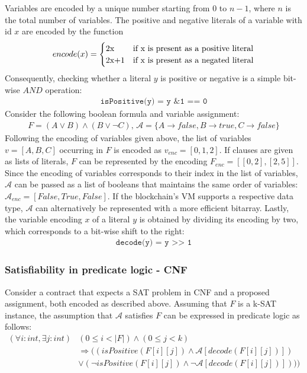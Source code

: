 Variables are encoded by a unique number starting from $0$ to $n-1$, where $n$ is the total number of variables. The positive and negative literals of a variable with id $x$ are encoded by the function
\begin{align*}
encode(x) =
\begin{cases}
  $2x$  & \text{if x is present as a positive literal}\\
  $2x+1$ & \text{if x is present as a negated literal}\\
\end{cases}   
\end{align*}
Consequently, checking whether a literal $y$ is positive or negative is a simple bit-wise $AND$ operation:
\begin{align*}
\texttt{isPositive(y) = y \& 1 == 0}
\end{align*}
Consider the following boolean formula and variable assignment:
\begin{align*}
F = (A \vee B) \wedge (B \vee \neg C) \text{, } \mathcal{A} = \{A \rightarrow false, B \rightarrow true, C \rightarrow false\}
\end{align*}
Following the encoding of variables given above, the list of variables $v=[A,B,C]$ occurring in $F$ is encoded as $v_{enc} = [0,1,2]$. If clauses are given as lists of literals, $F$ can be represented by the encoding $F_{enc} = [[0,2],[2,5]]$. Since the encoding of variables corresponds to their index in the list of variables, $\mathcal{A}$ can be passed as a list of booleans that maintains the same order of variables: $\mathcal{A}_{enc} = [False, True, False]$. If the blockchain's VM supports a respective data type, $\mathcal{A}$ can alternatively be represented with a more efficient bitarray. Lastly, the variable encoding $x$ of a literal $y$ is obtained by dividing its encoding by two, which corresponds to a bit-wise shift to the right:
\begin{align*}
\texttt{decode(y) = y >> 1}
\end{align*}

\subsubsection{Satisfiability in predicate logic - CNF}
Consider a contract that expects a SAT problem in CNF and a proposed assignment, both encoded as described above. Assuming that $F$ is a k-SAT instance, the assumption that $\mathcal{A}$ satisfies $F$ can be expressed in predicate logic as follows:
\begin{equation}\label{eq:cnf_sat}
\begin{aligned}
(\forall i : int, \exists j : int) &(0 \leq i < |F|) \wedge (0 \leq j < k) \\
&\Rightarrow ((isPositive(F[i][j]) \wedge \mathcal{A}[decode(F[i][j])]) \\
&\vee (\neg isPositive(F[i][j]) \wedge \neg \mathcal{A}[decode(F[i][j])])))
\end{aligned}
\end{equation}

